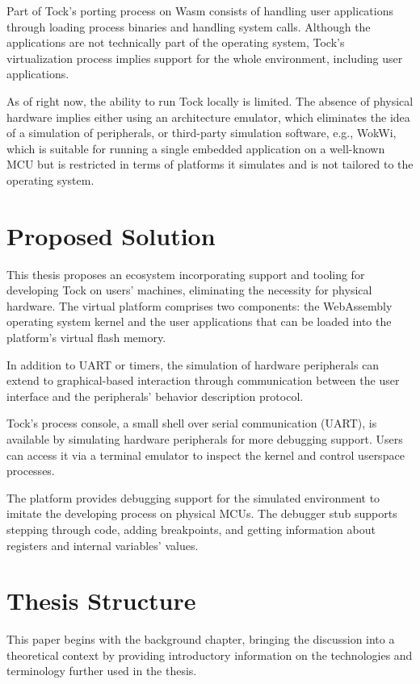 \documentclass[12pt,a4paper]{report}
\begin{document}
Part of Tock's porting process on Wasm consists of handling user applications through loading process binaries and handling system calls. Although the applications are not technically part of the operating system, Tock's virtualization process implies support for the whole environment, including user applications.

As of right now, the ability to run Tock locally is limited. The absence of physical hardware implies either using an architecture emulator, which eliminates the idea of a simulation of peripherals, or third-party simulation software, e.g., WokWi, which is suitable for running a single embedded application on a well-known MCU but is restricted in terms of platforms it simulates and is not tailored to the operating system.

\section{Proposed Solution}

This thesis proposes an ecosystem incorporating support and tooling for developing Tock on users' machines, eliminating the necessity for physical hardware. The virtual platform comprises two components: the WebAssembly operating system kernel and the user applications that can be loaded into the platform's virtual flash memory.

In addition to UART or timers, the simulation of hardware peripherals can extend to graphical-based interaction through communication between the user interface and the peripherals' behavior description protocol.

Tock's process console, a small shell over serial communication (UART), is available by simulating hardware peripherals for more debugging support. Users can access it via a terminal emulator to inspect the kernel and control userspace processes.

The platform provides debugging support for the simulated environment to imitate the developing process on physical MCUs. The debugger stub supports stepping through code, adding breakpoints, and getting information about registers and internal variables' values.

\section{Thesis Structure}

This paper begins with the background chapter, bringing the discussion into a theoretical context by providing introductory information on the technologies and terminology further used in the thesis.
\end{document}

